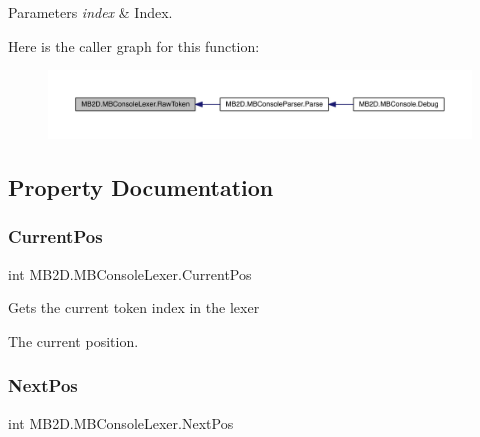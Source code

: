 \begin{DoxyParams}{Parameters}
{\em index} & Index.\\
\hline
\end{DoxyParams}
Here is the caller graph for this function\+:
\nopagebreak
\begin{figure}[H]
\begin{center}
\leavevmode
\includegraphics[width=350pt]{class_m_b2_d_1_1_m_b_console_lexer_a9f08e0a2739eb027f6b8c46abe67f647_icgraph}
\end{center}
\end{figure}


\subsection{Property Documentation}
\hypertarget{class_m_b2_d_1_1_m_b_console_lexer_a15d3752a0f36b998985befdabfdb475e}{}\label{class_m_b2_d_1_1_m_b_console_lexer_a15d3752a0f36b998985befdabfdb475e} 
\subsubsection{\texorpdfstring{Current\+Pos}{CurrentPos}}
{\footnotesize\ttfamily int M\+B2\+D.\+M\+B\+Console\+Lexer.\+Current\+Pos\hspace{0.3cm}{\ttfamily [get]}}



Gets the current token index in the lexer 

The current position.\hypertarget{class_m_b2_d_1_1_m_b_console_lexer_aa3535c7e87e9d7855e3fb7848bf46ba8}{}\label{class_m_b2_d_1_1_m_b_console_lexer_aa3535c7e87e9d7855e3fb7848bf46ba8} 
\subsubsection{\texorpdfstring{Next\+Pos}{NextPos}}
{\footnotesize\ttfamily int M\+B2\+D.\+M\+B\+Console\+Lexer.\+Next\+Pos\hspace{0.3cm}{\ttfamily [get]}}



